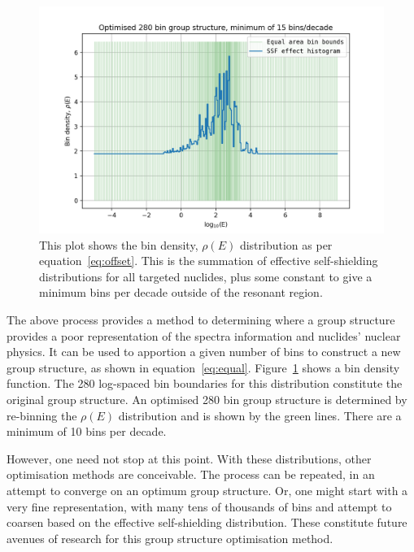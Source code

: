 \begin{figure}
  \centering
  \includegraphics[width=\linewidth]{nbins-280_bpd-15}
  \caption[Bin density distribution in energy for a particular optimisation.]{This plot shows the bin density, $\rho(E)$ distribution as per equation~\ref{eq:offset}. This is the summation of effective self-shielding distributions for all targeted nuclides, plus some constant to give a minimum bins per decade outside of the resonant region.}
  \label{fig:optimised_bounds}
\end{figure}

The above process provides a method to determining where a group structure provides a poor representation of the spectra information and nuclides' nuclear physics. It can be used to apportion a given number of bins to construct a new group structure, as shown in equation~\ref{eq:equal}. Figure~\ref{fig:optimised_bounds} shows a bin density function. The 280 log-spaced bin boundaries for this distribution constitute the original group structure. An optimised 280 bin group structure is determined by re-binning the $\rho(E)$ distribution and is shown by the green lines. There are a minimum of 10 bins per decade. 

However, one need not stop at this point. With these distributions, other optimisation methods are conceivable. The process can be repeated, in an attempt to converge on an optimum group structure. Or, one might start with a very fine representation, with many tens of thousands of bins and attempt to coarsen based on the effective self-shielding distribution. These constitute future avenues of research for this group structure optimisation method.

\FloatBarrier

